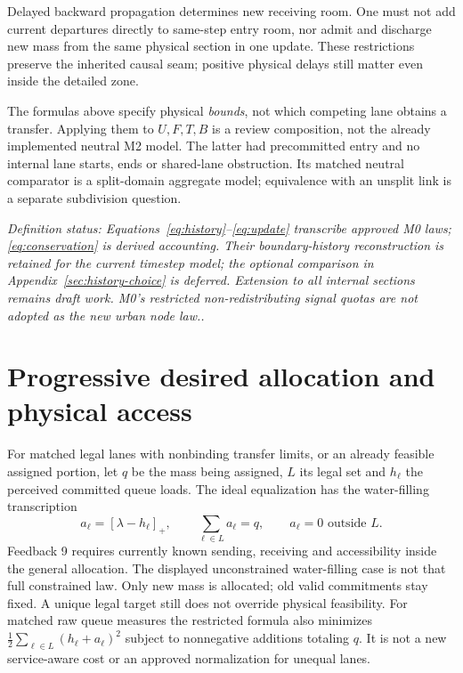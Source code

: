 \documentclass[11pt]{article}
\newcommand{\pos}[1]{\left[#1\right]_+}
\newcommand{\status}[1]{\textit{Definition status: #1.}}
\begin{document}
Delayed backward propagation determines new receiving room. One must not add current departures directly to same-step entry room, nor admit and discharge new mass from the same physical section in one update. These restrictions preserve the inherited causal seam; positive physical delays still matter even inside the detailed zone.

The formulas above specify physical \emph{bounds}, not which competing lane obtains a transfer. Applying them to $U,F,T,B$ is a review composition, not the already implemented neutral M2 model. The latter had precommitted entry and no internal lane starts, ends or shared-lane obstruction. Its matched neutral comparator is a split-domain aggregate model; equivalence with an unsplit link is a separate subdivision question.

\status{Equations~\eqref{eq:history}--\eqref{eq:update} transcribe approved M0 laws; \eqref{eq:conservation} is derived accounting. Their boundary-history reconstruction is retained for the current timestep model; the optional comparison in Appendix~\ref{sec:history-choice} is deferred. Extension to all internal sections remains draft work. M0's restricted non-redistributing signal quotas are not adopted as the new urban node law.}

\section{Progressive desired allocation and physical access}

For matched legal lanes with nonbinding transfer limits, or an already feasible assigned portion, let $q$ be the mass being assigned, $L$ its legal set and $h_\ell$ the perceived committed queue loads. The ideal equalization has the water-filling transcription
\begin{equation}
 a_\ell=\pos{\lambda-h_\ell},\qquad
 \sum_{\ell\in L} a_\ell=q,\qquad a_\ell=0\text{ outside }L.
 \label{eq:allocation}
\end{equation}
Feedback 9 requires currently known sending, receiving and accessibility inside the general allocation. The displayed unconstrained water-filling case is not that full constrained law. Only new mass is allocated; old valid commitments stay fixed. A unique legal target still does not override physical feasibility. For matched raw queue measures the restricted formula also minimizes $\tfrac12\sum_{\ell\in L}(h_\ell+a_\ell)^2$ subject to nonnegative additions totaling $q$. It is not a new service-aware cost or an approved normalization for unequal lanes.
\end{document}
